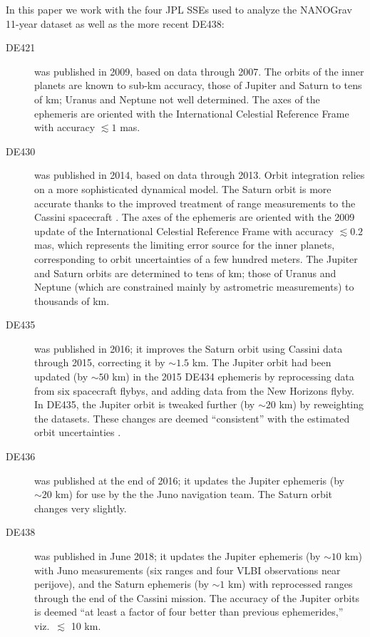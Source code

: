\documentclass[iop,apj,twocolappendix]{emulateapj}
\begin{document}
In this paper we work with the four JPL SSEs used to analyze the NANOGrav 11-year dataset \citep{2018ApJ...859...47A} as well as the more recent DE438:
%
\begin{description}
%
\item[DE421 \citep{2009IPNPR.178C...1F}] was published in 2009, based on data through 2007. The orbits of the inner planets are known to sub-km accuracy, those of Jupiter and Saturn to tens of km; Uranus and Neptune not well determined. The axes of the ephemeris are oriented with the International Celestial Reference Frame \citep{Ma_1998} with accuracy $\lesssim 1$ mas.
%
\item[DE430 \citep{2014IPNPR.196C...1F}] was published in 2014, based on data through 2013. Orbit integration relies on a more sophisticated dynamical model. The Saturn orbit is more accurate thanks to the improved treatment of range measurements to the Cassini spacecraft \citep{PhysRevD.89.102002}.
The axes of the ephemeris are oriented with the 2009 update of the International Celestial Reference Frame \citep{2015AJ....150...58F} with accuracy $\lesssim 0.2$ mas, which represents the limiting error source for the inner planets, corresponding to orbit uncertainties of a few hundred meters. The Jupiter and Saturn orbits are determined to tens of km; those of Uranus and Neptune (which are constrained mainly by astrometric measurements) to thousands of km. 
%
\item[DE435 \citep{de435}] was published in 2016; it improves the Saturn orbit using Cassini data through 2015, correcting it by $\sim 1.5$ km. The Jupiter orbit had been updated (by $\sim 50$ km) in the 2015 DE434 ephemeris \citep{de434} by reprocessing data from six spacecraft flybys, and adding data from the New Horizons flyby. In DE435, the Jupiter orbit is tweaked further (by $\sim 20$ km) by reweighting the datasets. These changes are deemed ``consistent'' with the estimated orbit uncertainties \citep{de434,de435}.
%
\item[DE436 \citep{de436}] was published at the end of 2016; it updates the Jupiter ephemeris (by $\sim 20$ km) for use by the the Juno navigation team. The Saturn orbit changes very slightly.
%
\item[DE438 \citep{de438}] was published in June 2018; it updates the Jupiter ephemeris (by $\sim 10$ km) with Juno measurements (six ranges and four VLBI observations near perijove), and the Saturn ephemeris (by $\sim 1$ km) with reprocessed ranges through the end of the Cassini mission. The accuracy of the Jupiter orbits is deemed ``at least a factor of four better than previous ephemerides,'' viz.\ $\lesssim$ 10 km.
%
\end{description}
\end{document}
